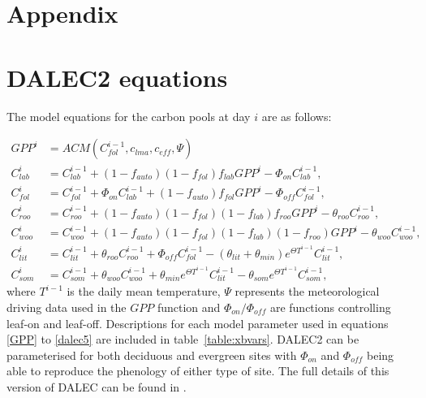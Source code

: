 \documentclass[11pt]{article}
\begin{document}
{}

\section*{Appendix}

\section{DALEC2 equations} \label{sec:dalec_eqns}

The model equations for the carbon pools at day $i$ are as follows:

\begin{align}
GPP^{i} &= ACM(C_{fol}^{i-1}, c_{lma}, c_{eff}, \Psi) \label{GPP}
\\C_{lab}^{i}&=C_{lab}^{i-1}+(1-f_{auto})(1-f_{fol})f_{lab}GPP^{i}-\Phi _{on}C_{lab}^{i-1}, \label{daleclab}
\\C_{fol}^{i}&=C_{fol}^{i-1}+\Phi_{on}C_{lab}^{i-1}+(1-f_{auto})f_{fol}GPP^{i}-\Phi_{off}C_{fol}^{i-1}, \label{dalec1}
\\C_{roo}^{i}&=C_{roo}^{i-1}+(1-f_{auto})(1-f_{fol})(1-f_{lab})f_{roo}GPP^{i}-\theta_{roo}C_{roo}^{i-1}, 
\\C_{woo}^{i}&=C_{woo}^{i-1}+(1-f_{auto})(1-f_{fol})(1-f_{lab})(1-f_{roo})GPP^{i}-\theta_{woo}C_{woo}^{i-1}, 
\\C_{lit}^{i}&=C_{lit}^{i-1}+\theta_{roo}C_{roo}^{i-1}+\Phi_{off}C_{fol}^{i-1}-(\theta_{lit}+\theta_{min})e^{\Theta T^{i-1}}C_{lit}^{i-1}, 
\\C_{som}^{i}&=C_{som}^{i-1}+\theta_{woo}C_{woo}^{i-1}+\theta_{min}e^{\Theta T^{i-1}}C_{lit}^{i-1}-\theta_{som}e^{\Theta T^{i-1}}C_{som}^{i-1}, \label{dalec5}
\end{align}
where $T^{i-1}$ is the daily mean temperature, $\Psi$ represents the meteorological driving data used in the $GPP$ function and $\Phi_{on} / \Phi_{off}$ are functions controlling leaf-on and leaf-off. Descriptions for each model parameter used in equations \eqref{GPP} to \eqref{dalec5} are included in table~\ref{table:xbvars}. DALEC2 can be parameterised for both deciduous and evergreen sites with $\Phi_{on}$ and $\Phi_{off}$ being able to reproduce the phenology of either type of site. The full details of this version of DALEC can be found in \cite{Bloom2015}. 
\end{document}
